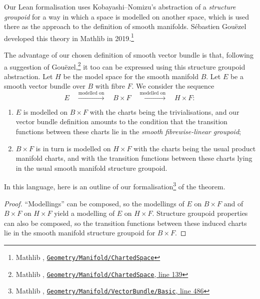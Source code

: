 \documentclass[12pt]{llncs}
\begin{document}
Our Lean formalisation
uses Kobayashi--Nomizu's abstraction of a \emph{structure groupoid} \cite{KN63}
for a way in which a space is modelled on another space,
which is used there as the approach to the definition of smooth manifolds.
S\'ebastien Gou\"ezel developed this theory in Mathlib in 2019.\footnote{
  Mathlib \cite{Mathlib}, \href{https://github.com/leanprover-community/mathlib4/blob/21b3a48ba0f69a4ae9eb44dbacbc4de43a6290bf/Mathlib/Geometry/Manifold/ChartedSpace.lean}{\texttt{Geometry/Manifold/ChartedSpace}}
}

The advantage of our chosen definition of smooth vector bundle
is that, following a suggestion of Gou\"ezel,\footnote{
  Mathlib \cite{Mathlib}, \href{https://github.com/leanprover-community/mathlib4/blob/21b3a48ba0f69a4ae9eb44dbacbc4de43a6290bf/Mathlib/Geometry/Manifold/ChartedSpace.lean\#L139}{\texttt{Geometry/Manifold/ChartedSpace}, line 139}
} 
it too can be expressed using this structure groupoid abstraction.
  Let $H$ be the model space for the smooth manifold $B$.  Let $E$ be a smooth vector bundle over
  $B$ with fibre $F$. We consider the sequence
  \[
    E \quad \xrightarrow{\text{modelled on}} \quad B \times F \quad \xrightarrow{\text{modelled on}} \quad H \times F:
  \]
\begin{enumerate}
  \item $E$ is modelled on $B \times F$ with the charts being the trivialisations,
      and our vector bundle definition amounts to the condition that the transition functions between these charts lie in the \emph{smooth fibrewise-linear
       groupoid};
  \item $B \times F$ is in turn is modelled on $H \times F$ with the charts being the usual
    product manifold charts, and with the transition functions between these charts lying in the
    usual smooth manifold structure groupoid.
\end{enumerate}
In this language, here is an outline of our formalisation\footnote{
  Mathlib \cite{Mathlib}, \href{https://github.com/leanprover-community/mathlib4/blob/21b3a48ba0f69a4ae9eb44dbacbc4de43a6290bf/Mathlib/Geometry/Manifold/VectorBundle/Basic.lean\#L486}{\texttt{Geometry/Manifold/VectorBundle/Basic}, line 486}}
of the theorem.

\begin{proof}
  ``Modellings'' can be composed, so the modellings of $E$ on $B \times F$ and of $B \times F$ on
$H \times F$ yield a modelling of $E$ on $H \times F$. Structure groupoid properties can also
be composed, so the transition functions between these induced charts lie in the smooth manifold
structure groupoid for $B \times F$.
\end{proof}
\end{document}

